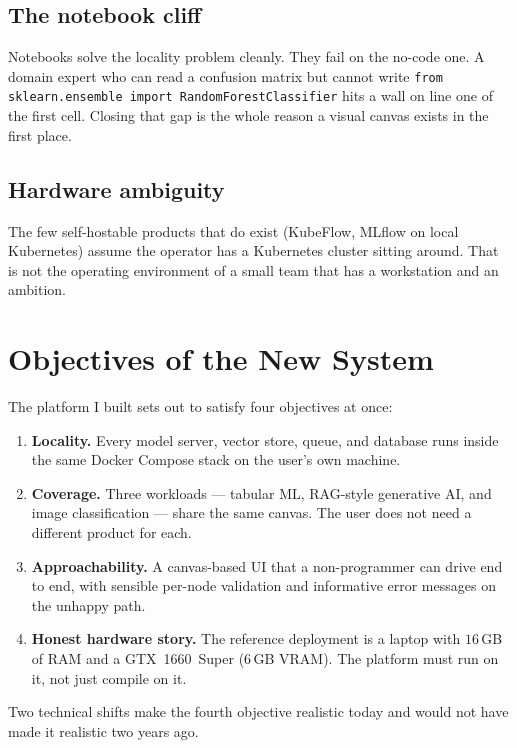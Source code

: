 \documentclass[12pt, a4paper]{report}
\begin{document}
\subsection{The notebook cliff}

Notebooks solve the locality problem cleanly. They fail on the
no-code one. A domain expert who can read a confusion matrix but
cannot write \texttt{from sklearn.ensemble import RandomForestClassifier}
hits a wall on line one of the first cell. Closing that gap is the
whole reason a visual canvas exists in the first place.

\subsection{Hardware ambiguity}

The few self-hostable products that do exist (KubeFlow, MLflow on
local Kubernetes) assume the operator has a Kubernetes cluster
sitting around. That is not the operating environment of a small
team that has a workstation and an ambition.

\section{Objectives of the New System}

The platform I built sets out to satisfy four objectives at once:

\begin{enumerate}
    \item \textbf{Locality.} Every model server, vector store, queue,
        and database runs inside the same Docker Compose stack on the
        user's own machine.
    \item \textbf{Coverage.} Three workloads --- tabular ML, RAG-style
        generative AI, and image classification --- share the same
        canvas. The user does not need a different product for each.
    \item \textbf{Approachability.} A canvas-based UI that a
        non-programmer can drive end to end, with sensible
        per-node validation and informative error messages on the
        unhappy path.
    \item \textbf{Honest hardware story.} The reference deployment is
        a laptop with $16$\,GB of RAM and a GTX~1660~Super (6\,GB
        VRAM). The platform must run on it, not just compile on it.
\end{enumerate}

Two technical shifts make the fourth objective realistic today and
would not have made it realistic two years ago.
\end{document}

